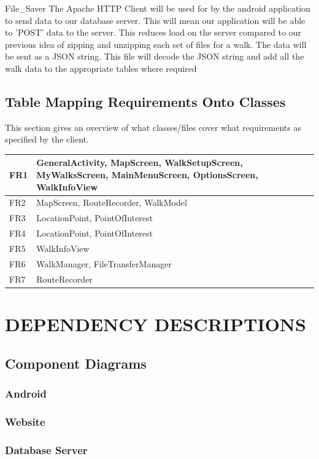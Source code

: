 \documentclass[12pt]{article}
\makeatletter
\renewcommand{\paragraph}{
  \@startsection{paragraph}{4}
  {\z@}{3.25ex \@plus -10em \@minus 1em}{0.1em}
  {\normalfont\normalsize\bfseries}
}
\makeatother
\begin{document}
\paragraph{File\_Saver}
The Apache HTTP Client will be used for by the android application to send data to our database server. This will mean our application will be able to 'POST' data to the server. This reduces load on the server compared to our previous idea of zipping and unzipping each set of files for a walk. The data will be sent as a JSON string. This file will decode the JSON string and add all the walk data to the appropriate tables where required
\subsection{Table Mapping Requirements Onto Classes}
This section gives an overview of what classes/files cover what requirements as specified by the client.

\begin{tabular}{|p{1cm}|p{10cm}|}
\hline
	FR1 & GeneralActivity, MapScreen, WalkSetupScreen, MyWalksScreen, MainMenuScreen, OptionsScreen, WalkInfoView\\
\hline
	FR2 & MapScreen, RouteRecorder, WalkModel\\
\hline
	FR3 & LocationPoint, PointOfInterest\\
\hline
	FR4 & LocationPoint, PointOfInterest\\
\hline
	FR5 & WalkInfoView\\
\hline
	FR6 & WalkManager, FileTransferManager
\\
\hline
	FR7 & RouteRecorder\\
\hline
\end{tabular}
\newpage
\section{DEPENDENCY DESCRIPTIONS}
\subsection{Component Diagrams}
\subsubsection{Android}
\subsubsection{Website}
\subsubsection{Database Server}
\end{document}
